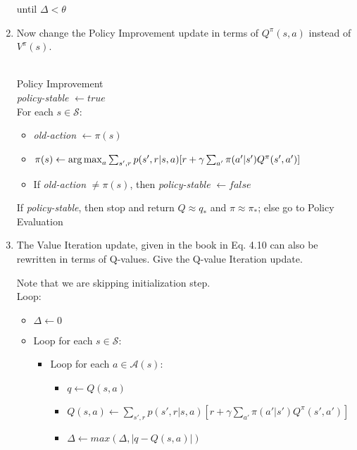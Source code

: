 \documentclass{exam}
\begin{document}
\begin{problem}
\begin{enumerate}
\begin{solutionorlines}[2in]
\begin{itemize}
    \end{itemize}
    until $\Delta < \theta$
    \end{solutionorlines}
    \item Now change the Policy Improvement update in terms of $Q^{\pi}(s, a)$ instead of $V^{\pi}(s)$.
    \begin{solutionorlines}[2in]
    \ \\
    Policy Improvement\\
    \textit{policy-stable} $\leftarrow true$\\
    For each $s \in \mathcal{S}$:
    \begin{itemize}[noitemsep,nolistsep]
        \item[ ] \textit{old-action} $\leftarrow \pi(s)$
        \item[ ] $\pi(s) \leftarrow \operatorname*{arg\,max}_a \sum_{s', r} p(s', r| s, a) [r + \gamma \sum_{a'} \pi(a'|s') Q^{\pi}(s', a')]$
        \item[ ] If \textit{old-action} $\neq \pi(s)$, then \textit{policy-stable} $\leftarrow false$
    \end{itemize}
    If \textit{policy-stable}, then stop and return $Q \approx q_*$ and $\pi \approx \pi_*$; else go to Policy Evaluation
    \end{solutionorlines}
    \item The Value Iteration update, given in the book in Eq. 4.10 can also be rewritten in terms of Q-values. Give the Q-value Iteration update.
    \begin{solutionorlines}[2in]
    Note that we are skipping initialization step. \\
    Loop:
    \begin{itemize}[noitemsep,nolistsep]
        \item[ ] $\Delta \leftarrow 0$
        \item[ ] Loop for each $s \in \mathcal{S}$:
        \begin{itemize}[noitemsep,nolistsep]
            \item[ ] Loop for each $a \in \mathcal{A}(s)$:
            \begin{itemize}[noitemsep,nolistsep]
                \item[ ] $q \leftarrow Q(s, a)$
                \item[ ] $Q(s, a) \leftarrow \sum_{s', r} p(s', r| s, a) [r + \gamma \sum_{a'} \pi(a'|s') Q^{\pi}(s', a')]$
                \item[ ] $\Delta \leftarrow max(\Delta, |q - Q(s, a)|)$
            \end{itemize}

\end{itemize}
\end{itemize}
\end{solutionorlines}
\end{enumerate}
\end{problem}
\end{document}
